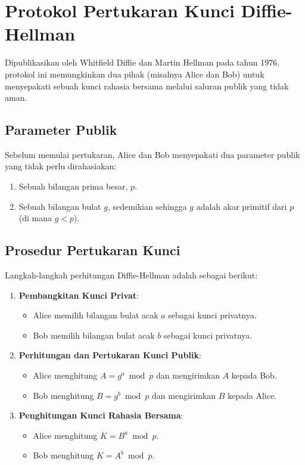\documentclass[../main.tex]{subfiles}
\begin{document}
\section{Protokol Pertukaran Kunci Diffie-Hellman}
Dipublikasikan oleh Whitfield Diffie dan Martin Hellman pada tahun 1976, protokol ini memungkinkan dua pihak (misalnya Alice dan Bob) untuk menyepakati sebuah kunci rahasia bersama melalui saluran publik yang tidak aman.

\subsection{Parameter Publik}
Sebelum memulai pertukaran, Alice dan Bob menyepakati dua parameter publik yang tidak perlu dirahasiakan:
\begin{enumerate}
    \item Sebuah bilangan prima besar, $p$.
    \item Sebuah bilangan bulat $g$, sedemikian sehingga $g$ adalah akar primitif dari $p$ (di mana $g < p$).
\end{enumerate}

\subsection{Prosedur Pertukaran Kunci}
Langkah-langkah perhitungan Diffie-Hellman adalah sebagai berikut:
\begin{enumerate}
    \item \textbf{Pembangkitan Kunci Privat}:
    \begin{itemize}
        \item Alice memilih bilangan bulat acak $a$ sebagai kunci privatnya.
        \item Bob memilih bilangan bulat acak $b$ sebagai kunci privatnya.
    \end{itemize}
    \item \textbf{Perhitungan dan Pertukaran Kunci Publik}:
    \begin{itemize}
        \item Alice menghitung $A = g^a \bmod p$ dan mengirimkan $A$ kepada Bob.
        \item Bob menghitung $B = g^b \bmod p$ dan mengirimkan $B$ kepada Alice.
    \end{itemize}
    \item \textbf{Penghitungan Kunci Rahasia Bersama}:
    \begin{itemize}
        \item Alice menghitung $K = B^a \bmod p$.
        \item Bob menghitung $K = A^b \bmod p$.
    \end{itemize}
\end{enumerate}
\end{document}
